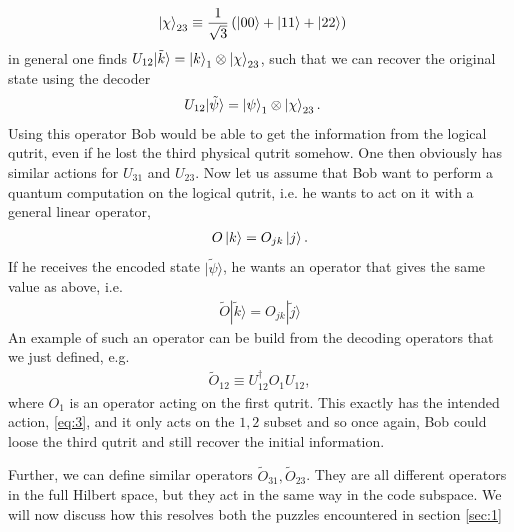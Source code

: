 \documentclass[letter,12pt]{article}
\begin{document}
\begin{equation}
	\begin{aligned}
		\ket{\chi}_{23}&\equiv \frac{1}{\sqrt{3}}\left(\ket{00}+\ket{11}+\ket{22}\right)
	\end{aligned}
\end{equation}
in general one finds $	U_{12}|\tilde k\rangle=\ket{k}_1\otimes \ket{\chi}_{23}$, 
such that we can recover the original state using the decoder
\begin{equation}
	\begin{aligned}
		U_{12}|\tilde \psi\rangle
		&=\ket{\psi}_1\otimes \ket{\chi}_{23}.
	\end{aligned}
\end{equation}
Using this operator Bob would be able to get the information from the logical qutrit, even if he lost the third physical qutrit somehow.
One then obviously has similar actions for $U_{31}$ and $U_{23}$. Now let us assume that Bob want to perform a quantum computation on the logical qutrit, i.e. he wants to act on it with a general linear operator,
\begin{equation}
	\begin{aligned}
		O\ket{k}=O_{jk}\ket{j}.
	\end{aligned}
\end{equation}
If he receives the encoded state $|\tilde \psi\rangle$, he wants an operator that gives the same value as above, i.e.
\begin{equation}
	\begin{aligned} \label{eq:3}
		\tilde{O}|\tilde k\rangle =O_{jk}|\tilde j\rangle 
	\end{aligned}
\end{equation}
An example of such an operator can be build from the decoding operators that we just defined, e.g.
\begin{equation}
	\begin{aligned}
		\tilde{O}_{12}\equiv U^\dagger_{12}O_1 U_{12},
	\end{aligned}
\end{equation}
where $O_1$ is an operator acting on the first qutrit.
This exactly has the intended action, \eqref{eq:3}, and it only acts on the $1,2$ subset and so once again, Bob could loose the third qutrit and still recover the initial information. 

Further, we can define similar operators $\tilde{O}_{31},\tilde{O}_{23}$. They are all different operators in the full Hilbert space, but they act in the same way in the code subspace. We will now discuss how this resolves both the puzzles encountered in section \ref{sec:1}
\end{document}
